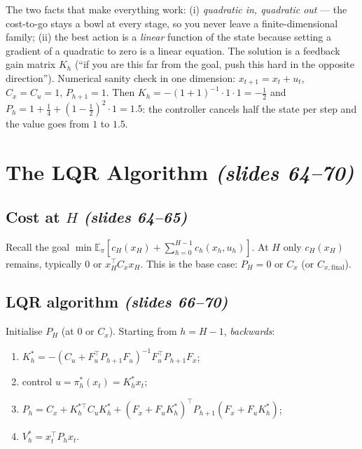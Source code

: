 \documentclass[11pt,a4paper]{article}
\newcommand{\E}{\mathbb{E}}
\newcommand{\slides}[1]{\emph{(slides #1)}}
\theoremstyle{plain}
\theoremstyle{definition}
\theoremstyle{remark}
\begin{document}
\begin{intuition}
The two facts that make everything work: (i) \emph{quadratic in, quadratic out} --- the cost-to-go stays a bowl at every stage, so you never leave a finite-dimensional family; (ii) the best action is a \emph{linear} function of the state because setting a gradient of a quadratic to zero is a linear equation. The solution is a feedback gain matrix $K_h$ (``if you are this far from the goal, push this hard in the opposite direction''). Numerical sanity check in one dimension: $x_{t+1}=x_t+u_t$, $C_x=C_u=1$, $P_{h+1}=1$. Then $K_h=-(1+1)^{-1}\cdot1\cdot1=-\tfrac12$ and $P_h=1+\tfrac14+(1-\tfrac12)^2\cdot1=1.5$: the controller cancels half the state per step and the value goes from $1$ to $1.5$.
\end{intuition}

\section{The LQR Algorithm \slides{64--70}}

\subsection{Cost at $H$ \slides{64--65}}

Recall the goal $\min\E_\pi[c_H(x_H)+\sum_{h=0}^{H-1}c_h(x_h,u_h)]$. At $H$ only $c_H(x_H)$ remains, typically $0$ or $x_H^\top C_xx_H$. This is the base case: $P_H=0$ or $C_x$ (or $C_{x,\mathrm{final}}$).

\subsection{LQR algorithm \slides{66--70}}

\begin{algorithm}[LQR]\label{alg:lqr}
Initialise $P_H$ (at $0$ or $C_x$). Starting from $h=H-1$, \emph{backwards}:
\begin{enumerate}[nosep]
  \item $K^*_h=-(C_u+F_u^\top P_{h+1}F_u)^{-1}F_u^\top P_{h+1}F_x$;
  \item control $u=\pi^*_h(x_t)=K^*_hx_t$;
  \item $P_h=C_x+K_h^{*\top}C_uK^*_h+(F_x+F_uK^*_h)^\top P_{h+1}(F_x+F_uK^*_h)$;
  \item $V^*_h=x_t^\top P_hx_t$.
\end{enumerate}
\end{algorithm}
\end{document}
